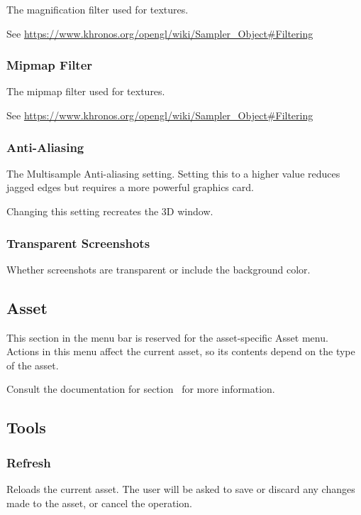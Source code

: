 \documentclass[10pt, a4paper, titlepage, oneside]{article}
\begin{document}
The magnification filter used for textures.

\sloppy
See \url{https://www.khronos.org/opengl/wiki/Sampler_Object#Filtering}

\subsubsection{Mipmap Filter}

The mipmap filter used for textures.

\sloppy
See \url{https://www.khronos.org/opengl/wiki/Sampler_Object#Filtering}

\subsubsection{Anti-Aliasing}

The Multisample Anti-aliasing setting. Setting this to a higher value reduces jagged edges but requires a more powerful graphics card.

 Changing this setting recreates the 3D window.
 
 \subsubsection{Transparent Screenshots}

Whether screenshots are transparent or include the background color.

\newpage

\subsection{Asset}

This section in the menu bar is reserved for the asset-specific Asset menu. Actions in this menu affect the current asset, so its contents depend on the type of the asset.

Consult the documentation for section~ for more information.

\subsection{Tools}

\subsubsection{Refresh}

Reloads the current asset. The user will be asked to save or discard any changes made to the asset, or cancel the operation.
\end{document}
